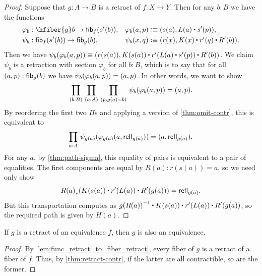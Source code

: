 \begin{proof}
Suppose that $g:A\to B$ is a retract of $f:X\to Y$. Then for any $b:B$ we have the functions
\begin{align*}
\varphi_b &:\hfiber{g}b\to\hfib{f}{s'(b)}, &
\varphi_b(a,p) & \defeq \pairr{s(a),L(a)\ct s'(p)},\\
\psi_b &:\hfib{f}{s'(b)}\to\hfib{g}b, &
\psi_b(x,q) &\defeq \pairr{r(x),K(x)\ct r'(q)\ct R'(b)}.
\end{align*}
Then we have $\psi_b(\varphi_b({a,p}))\equiv\pairr{r(s(a)),K(s(a))\ct r'(L(a)\ct s'(p))\ct R'(b)}$.
We claim $\psi_b$ is a retraction with section $\varphi_b$ for all $b:B$, which is to say that for all $(a,p):{\mathsf{fib}}_{g}(b)$ we have $\psi_b(\varphi_b({a,p}))= {\mathopen{}(a,p)\mathclose{}}$.
In other words, we want to show
\begin{equation*}
\prd{b:B}{a:A}{p:g(a)=b} \psi_b(\varphi_b({a,p}))= \pairr{a,p}.
\end{equation*}
By reordering the first two $\Pi$s and applying a version of \cref{thm:omit-contr}, this is equivalent to
\begin{equation*}
\prd{a:A}\psi_{g(a)}(\varphi_{g(a)}({a,\refl{g(a)}}))=\pairr{a,\refl{g(a)}}.
\end{equation*}
For any $a$, by \cref{thm:path-sigma}, this equality of pairs is equivalent to a pair of equalities. The first components are equal by $R(a):r(s(a))= a$, so we need only show
\begin{equation*}
\trans{R(a)}{K(s(a))\ct r'(L(a))\ct R'(g(a))} = \refl{g(a)}.
\end{equation*}
But this transportation computes as $\opp{g(R(a))}\ct K(s(a))\ct r'(L(a))\ct R'(g(a))$, so the required path is given by $H(a)$.
\end{proof}

\begin{thm}\label{thm:retract-equiv}
  If $g$ is a retract of an equivalence $f$, then $g$ is also an equivalence.
\end{thm}
\begin{proof}
  By \cref{lem:func_retract_to_fiber_retract}, every fiber of $g$ is a retract of a fiber of $f$.
  Thus, by \cref{thm:retract-contr}, if the latter are all contractible, so are the former.
\end{proof}

%

